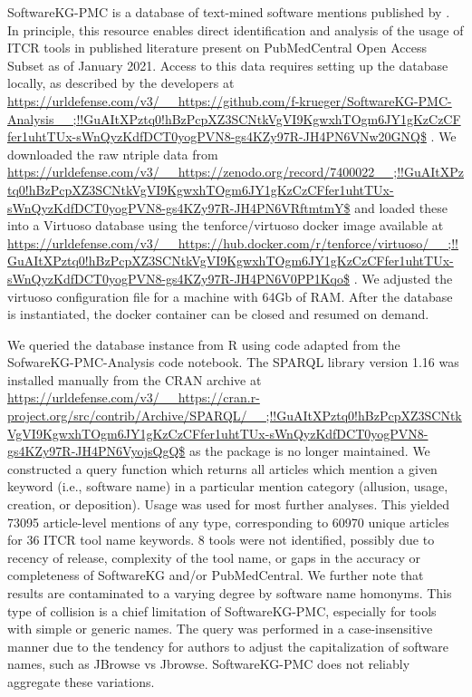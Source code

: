 SoftwareKG-PMC is a database of text-mined software mentions published by \cite{Usage}. In principle, this resource enables direct identification and analysis of the usage of ITCR tools in published literature present on PubMedCentral Open Access Subset as of January 2021. Access to this data requires setting up the database locally, as described by the developers at \url{https://urldefense.com/v3/__https://github.com/f-krueger/SoftwareKG-PMC-Analysis__;!!GuAItXPztq0!hBzPcpXZ3SCNtkVgVI9KgwxhTOgm6JY1gKzCzCFfer1uhtTUx-sWnQyzKdfDCT0yogPVN8-gs4KZy97R-JH4PN6VNw20GNQ$} . We downloaded the raw ntriple data from \url{https://urldefense.com/v3/__https://zenodo.org/record/7400022__;!!GuAItXPztq0!hBzPcpXZ3SCNtkVgVI9KgwxhTOgm6JY1gKzCzCFfer1uhtTUx-sWnQyzKdfDCT0yogPVN8-gs4KZy97R-JH4PN6VRftmtmY$}  and loaded these into a Virtuoso database using the tenforce/virtuoso docker image available at \url{https://urldefense.com/v3/__https://hub.docker.com/r/tenforce/virtuoso/__;!!GuAItXPztq0!hBzPcpXZ3SCNtkVgVI9KgwxhTOgm6JY1gKzCzCFfer1uhtTUx-sWnQyzKdfDCT0yogPVN8-gs4KZy97R-JH4PN6V0PP1Kqo$} . We adjusted the virtuoso configuration file for a machine with 64Gb of RAM. After the database is instantiated, the docker container can be closed and resumed on demand.



We queried the database instance from R using code adapted from the SofwareKG-PMC-Analysis code notebook. The SPARQL library version 1.16 was installed manually from the CRAN archive at \url{https://urldefense.com/v3/__https://cran.r-project.org/src/contrib/Archive/SPARQL/__;!!GuAItXPztq0!hBzPcpXZ3SCNtkVgVI9KgwxhTOgm6JY1gKzCzCFfer1uhtTUx-sWnQyzKdfDCT0yogPVN8-gs4KZy97R-JH4PN6VyojsQgQ$} as the package is no longer maintained. We constructed a query function which returns all articles which mention a given keyword (i.e., software name) in a particular mention category (allusion, usage, creation, or deposition). Usage was used for most further analyses. This yielded 73095 article-level mentions of any type, corresponding to 60970 unique articles for 36 ITCR tool name keywords. 8 tools were not identified, possibly due to recency of release, complexity of the tool name, or gaps in the accuracy or completeness of SoftwareKG and/or PubMedCentral. We further note that results are contaminated to a varying degree by software name homonyms. This type of collision is a chief limitation of SoftwareKG-PMC, especially for tools with simple or generic names. The query was performed in a case-insensitive manner due to the tendency for authors to adjust the capitalization of software names, such as JBrowse vs Jbrowse. SoftwareKG-PMC does not reliably aggregate these variations.



